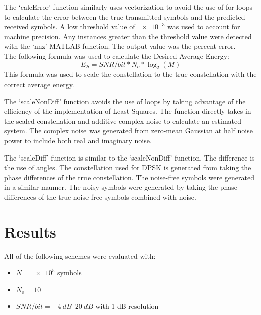 \documentclass[12pt]{report}
\begin{document}
\quad The `calcError' function similarly uses vectorization to avoid the use of for loops to calculate the error between the true transmitted symbols and the predicted received symbols. A low threshold value of $\num{e-3}$ was used to account for machine precision. Any instances greater than the threshold value were detected with the `nnz' MATLAB function. The output value was the percent error. \\

\noindent The following formula was used to calculate the Desired Average Energy:
\begin{equation}
    E_S = SNR/bit * N_o * \log_2(M)
\end{equation}
This formula was used to scale the constellation to the true constellation with the correct average energy.

\quad The `scaleNonDiff' function avoids the use of loops by taking advantage of the efficiency of the implementation of Least Squares. The function directly takes in the scaled constellation and additive complex noise to calculate an estimated system. The complex noise was generated from zero-mean Gaussian at half noise power to include both real and imaginary noise.

\quad The `scaleDiff' function is similar to the `scaleNonDiff' function. The difference is the use of angles. The constellation used for DPSK is generated from taking the phase differences of the true constellation. The noise-free symbols were generated in a similar manner. The noisy symbols were generated by taking the phase differences of the true noise-free symbols combined with noise.

\newpage

\section{Results}

All of the following schemes were evaluated with:
\begin{itemize}
    \item $N = \num{e5}$ symbols
    \item $N_o = 10$
    \item $SNR/bit = \SIrange{-4}{20}{dB}$ with 1 dB resolution
\end{itemize}
\end{document}
